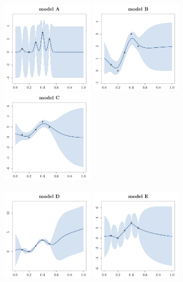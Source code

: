 \documentclass[a4paper,10pt]{article}
\begin{document}
\medskip
\begin{center}
  \includegraphics[width=4.6cm]{figures/exo_kriging_3.pdf}\quad 
  \includegraphics[width=4.6cm]{figures/exo_kriging_5.pdf}\quad 
  \includegraphics[width=4.6cm]{figures/exo_kriging_1.pdf}\\ \ \\
  \includegraphics[width=4.6cm]{figures/exo_kriging_2.pdf}\quad 
  \includegraphics[width=4.6cm]{figures/exo_kriging_4.pdf}\quad 

\end{center}
\end{document}
